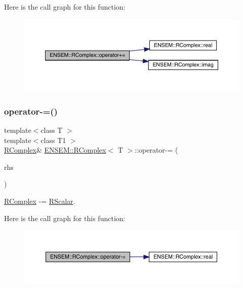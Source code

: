Here is the call graph for this function\+:
\nopagebreak
\begin{figure}[H]
\begin{center}
\leavevmode
\includegraphics[width=350pt]{d9/d0e/classENSEM_1_1RComplex_aca53957ad00d064844898e907e6f6fab_cgraph}
\end{center}
\end{figure}
\mbox{\label{classENSEM_1_1RComplex_af071c8c8f4d2a2cf17a9e4b01accf6bc}} 
\subsubsection{\texorpdfstring{operator-\/=()}{operator-=()}\hspace{0.1cm}{\footnotesize\ttfamily [1/4]}}
{\footnotesize\ttfamily template$<$class T $>$ \\
template$<$class T1 $>$ \\
\mbox{\hyperlink{classENSEM_1_1RComplex}{R\+Complex}}\& \mbox{\hyperlink{classENSEM_1_1RComplex}{E\+N\+S\+E\+M\+::\+R\+Complex}}$<$ T $>$\+::operator-\/= (\begin{DoxyParamCaption}\item[{const \mbox{\hyperlink{classENSEM_1_1RScalar}{R\+Scalar}}$<$ T1 $>$ \&}]{rhs }\end{DoxyParamCaption})\hspace{0.3cm}{\ttfamily [inline]}}



\mbox{\hyperlink{classENSEM_1_1RComplex}{R\+Complex}} -\/= \mbox{\hyperlink{classENSEM_1_1RScalar}{R\+Scalar}}. 

Here is the call graph for this function\+:
\nopagebreak
\begin{figure}[H]
\begin{center}
\leavevmode
\includegraphics[width=350pt]{d9/d0e/classENSEM_1_1RComplex_af071c8c8f4d2a2cf17a9e4b01accf6bc_cgraph}
\end{center}
\end{figure}
\mbox{\label{classENSEM_1_1RComplex_af071c8c8f4d2a2cf17a9e4b01accf6bc}} 
